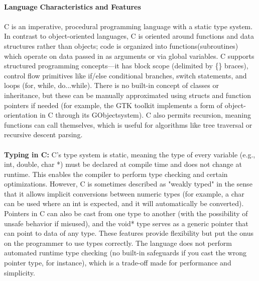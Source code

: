 \documentclass{article}
\begin{document}
\\
{\large \textbf{Language}}{\large \textbf{ Characteristics and Features}}\\
\\
{\normalsize C is an imperative, procedural programming language with a static type system. In contrast to object-oriented languages, C is oriented around functions and data structures rather than objects; code is organized into functions}{\normalsize  (subroutines) which operate on data passed in as arguments or via global variables. C supports structured programming concepts—it has block scope (delimited by \{\} braces), control flow primitives like if/else conditional branches, switch statements, and l}{\normalsize oops (for, while, do...while). There is no built-in concept of classes or inheritance, but these can be manually approximated using structs and function pointers if needed (for example, the GTK toolkit implements a form of object-orientation in C through i}{\normalsize ts }{\normalsize GObject}{\normalsize  system). C also permits recursion, meaning functions can call themselves, which is useful for algorithms like tree traversal or recursive descent parsing.}\\
\\
{\normalsize \textbf{Typing in C}}{\normalsize \textbf{: }}{\normalsize C's type system is static, meaning the type of every variable (e.g., }{\normalsize int, double, char *) must be declared at compile time and does not change at runtime. This enables the compiler to perform type checking and certain optimizations. However, C is sometimes described as "weakly typed" in the sense that it allows implicit con}{\normalsize versions between numeric types (for example, a char can be used where an int is expected, and it will automatically be converted). Pointers in C can also be cast from one type to another (with the possibility of unsafe behavior if misused), and the void* t}{\normalsize ype serves as a generic pointer that can point to data of any type. These features provide flexibility but put the onus on the programmer to use types correctly. The language does not perform automated runtime type checking (no built-in safeguards if you c}{\normalsize ast the wrong pointer type, for instance), which is a trade-off made for performance and simplicity.}\\
\\
\end{document}
